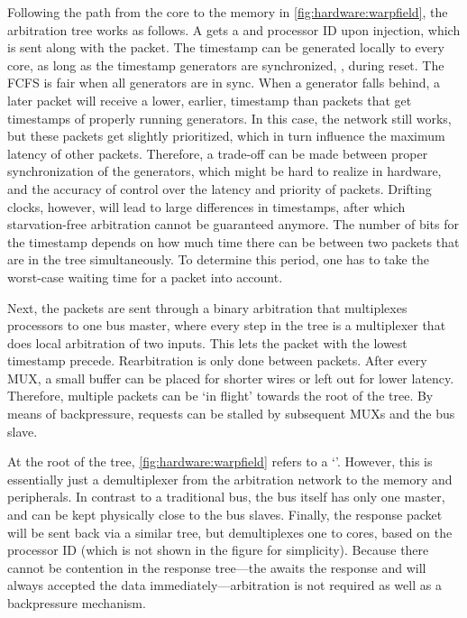 Following the path from the core to the memory in \cref{fig:hardware:warpfield}, the arbitration tree works as follows.
A  gets a  and processor \ac{ID} upon injection, which is sent along with the packet.
The timestamp can be generated locally to every core, as long as the timestamp generators are synchronized, \eg, during reset.
The \ac{FCFS} is fair when all generators are in sync.
When a generator falls behind, a later packet will receive a lower, \ie earlier, timestamp than packets that get timestamps of properly running generators.
In this case, the network still works, but these packets get slightly prioritized, which in turn influence the maximum latency of other packets.
Therefore, a trade-off can be made between proper synchronization of the generators, which might be hard to realize in hardware, and the accuracy of control over the latency and priority of packets.
Drifting clocks, however, will lead to large differences in timestamps, after which starvation-free arbitration cannot be guaranteed anymore.
The number of bits for the timestamp depends on how much time there can be between two packets that are in the tree simultaneously.
To determine this period, one has to take the worst-case waiting time for a packet into account.%

Next, the packets are sent through a binary arbitration  that multiplexes \SYMcorecount processors to one bus master, where every step in the tree is a multiplexer that does local arbitration of two inputs.
This  lets the packet with the lowest timestamp precede.
Rearbitration is only done between packets.
After every \ac{MUX}, a small buffer can be placed for shorter wires or left out for lower latency.
Therefore, multiple packets can be `in flight' towards the root of the tree.
By means of backpressure, requests can be stalled by subsequent \acp{MUX} and the bus slave.

At the root of the tree, \vref{fig:hardware:warpfield} refers to a `'.
However, this is essentially just a demultiplexer from the arbitration network to the memory and peripherals.
In contrast to a traditional bus, the bus itself has only one master, and can be kept physically close to the bus slaves.
Finally, the response packet will be sent back via a similar tree, but demultiplexes one to \SYMcorecount cores, based on the processor \ac{ID} (which is not shown in the figure for simplicity).
Because there cannot be contention in the response tree---the \MicroBlaze awaits the response and will always accepted the data immediately---arbitration is not required as well as a backpressure mechanism.

